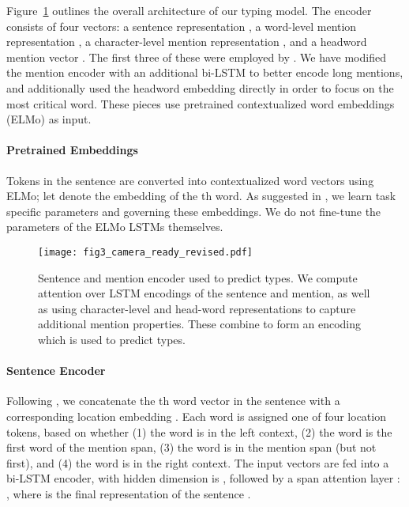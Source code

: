 \documentclass[11pt,a4paper]{article}
\begin{document}
Figure~\ref{fig:model} outlines the overall architecture of our typing model. The encoder  consists of four vectors: a sentence representation , a word-level mention representation , a character-level mention representation , and a headword mention vector . The first three of these were employed by \citet{Eunsol_Choi_18}. We have modified the mention encoder with an additional bi-LSTM to better encode long mentions, and additionally used the headword embedding directly in order to focus on the most critical word. These pieces use pretrained contextualized word embeddings (ELMo) \cite{ELMO_18} as input. 

\paragraph{Pretrained Embeddings} 
Tokens in the sentence  are converted into contextualized word vectors using ELMo; let  denote the embedding of the th word. As suggested in \citet{ELMO_18}, we learn task specific parameters  and  governing these embeddings. We do not fine-tune the parameters of the ELMo LSTMs themselves.




\begin{figure}[t]
\centering
    \centering
    \texttt{[image: fig3\_camera\_ready\_revised.pdf]}
    \caption{Sentence and mention encoder used to predict types. We compute attention over LSTM encodings of the sentence and mention, as well as using character-level and head-word representations to capture additional mention properties. These combine to form an encoding which is used to predict types.}
    \label{fig:model}
\end{figure}



\vspace{-4pt}
\paragraph{Sentence Encoder}  Following \citet{Eunsol_Choi_18}, we concatenate the th word vector  in the sentence with a corresponding location embedding . Each word is assigned one of four location tokens, based on whether (1) the word is in the left context, (2) the word is the first word of the mention span, (3) the word is in the mention span (but not first), and (4) the word is in the right context. The input vectors  are fed into a bi-LSTM encoder, with hidden dimension is , followed by a span attention layer \cite{Kenton_Lee17,Eunsol_Choi_18}: , where  is the final representation of the sentence .
\end{document}
